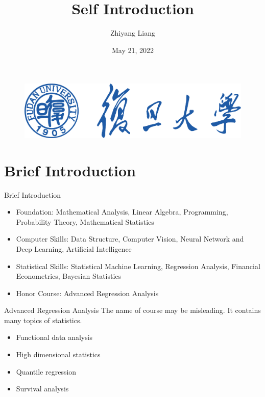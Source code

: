 \documentclass{beamer}
\author{Zhiyang Liang}
\title{Self Introduction}
\subtitle{}
\institute{School of Data Science, Fudan University}
\date{May 21, 2022}
\begin{document}
\begin{frame}
    \titlepage
    \begin{figure}[htpb]
        \begin{center}
            \includegraphics[width=0.618\linewidth]{pic/fdu_logo_blue.pdf}
        \end{center}
    \end{figure}
\end{frame}

\begin{frame}
    \tableofcontents[sectionstyle=show,subsectionstyle=show/shaded/hide,subsubsectionstyle=show/shaded/hide]
\end{frame}


\section{Brief Introduction}
    \begin{frame}{Brief Introduction}
        \begin{itemize}
            \item Foundation: Mathematical Analysis, Linear Algebra, Programming, Probability Theory, Mathematical Statistics
            \item Computer Skills: Data Structure, Computer Vision, Neural Network and Deep Learning, Artificial Intelligence
            \item Statistical Skills: Statistical Machine Learning, Regression Analysis, Financial Econometrics, Bayesian Statistics
            \item Honor Course: Advanced Regression Analysis
        \end{itemize}
         
    \end{frame}
    \begin{frame}{Advanced Regression Analysis}
    The name of course may be misleading. It contains many topics of statistics.
        \begin{itemize}
            \item Functional data analysis
            \item High dimensional statistics
            \item Quantile regression
            \item Survival analysis
        \end{itemize}
         
    \end{frame}
\end{document}
